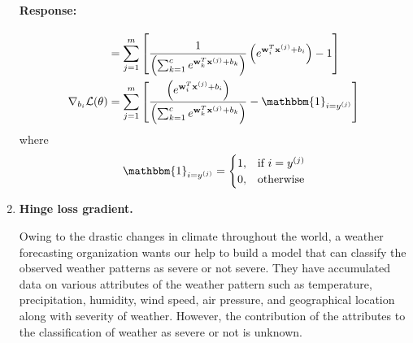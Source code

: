 \documentclass{article}
\newcommand{\x}{\bf{x}}
\newcommand{\w}{\bf{w}}
\newenvironment{response}{\begin{responseframe}\vspace{-10pt}\paragraph{Response:}}{\end{responseframe}}
\renewcommand{\bf}[1]{\textbf{{#1}}}
\begin{document}
\begin{enumerate}
\begin{response}
\begin{align*}
                    &= 
                    \sum^{m}_{j = 1}
                    \left[  
                        \frac{1}{\left( \sum^{c}_{k = 1} e^{\w^{T}_{k} \x^{(j)} + b_k} \right)}
                        \left( e^{\w^{T}_{i} \x^{(j)} + b_i} \right)
                        - 
                        1
                    \right] \\
                    \nabla_{b_i} \mathcal{L} (\theta)
                    &= 
                    \sum^{m}_{j = 1}
                    \left[  
                        \frac{\left( e^{\w^{T}_{i} \x^{(j)} + b_i} \right)}
                        {\left( \sum^{c}_{k = 1} e^{\w^{T}_{k} \x^{(j)} + b_k} \right)}
                        - 
                        \mathbbm{1}_{i = y^{(j)}}
                    \right]
                \end{align*}
                where 
                \[\mathbbm{1}_{i = y^{(j)}} = \begin{cases} 1, & \text{if } i = y^{(j)} \\ 0, & \text{otherwise} \end{cases}\]
            \end{response}
        \item \bf{Hinge loss gradient.} \vspace{10pt}

            Owing to the drastic changes in climate throughout the world, a weather forecasting 
            organization wants our help to build a model that can classify the observed weather 
            patterns as severe or not severe. They have accumulated data on various attributes of 
            the weather pattern such as temperature, precipitation, humidity, wind speed, air 
            pressure, and geographical location along with severity of weather. However, the 
            contribution of the attributes to the classification of weather as severe or not is unknown. \vspace{10pt}


\end{enumerate}
\end{document}
